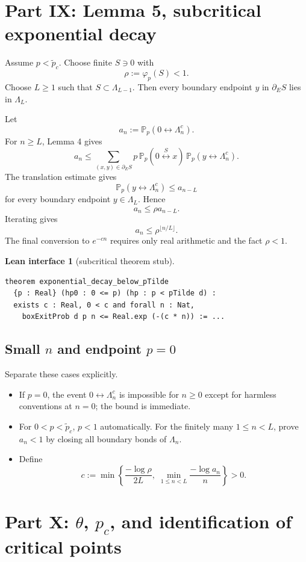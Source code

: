 \documentclass[11pt]{article}
\newcommand{\PP}{\mathbb P}
\newcommand{\conn}{\longleftrightarrow}
\newcommand{\pcrit}{p_c}
\newcommand{\ptilde}{\widetilde p_c}
\newcommand{\Lam}{\Lambda}
\newcommand{\dE}{\partial_E}
\theoremstyle{definition}
\newtheorem{interface}[definition]{Lean interface}
\theoremstyle{plain}
\begin{document}
\section{Part IX: Lemma 5, subcritical exponential decay}

Assume $p<\ptilde$.  Choose finite $S\ni0$ with
\[
  \rho:=\varphi_p(S)<1.
\]
Choose $L\ge1$ such that $S\subset\Lam_{L-1}$.  Then every boundary endpoint $y$ in $\dE S$ lies in $\Lam_L$.

Let
\[
  a_n:=\PP_p(0\conn\Lam_n^c).
\]
For $n\ge L$, Lemma 4 gives
\[
  a_n
  \le
  \sum_{(x,y)\in\dE S}
  p\,\PP_p(0\stackrel S\conn x)\,
  \PP_p(y\conn\Lam_n^c).
\]
The translation estimate gives
\[
  \PP_p(y\conn\Lam_n^c)
  \le a_{n-L}
\]
for every boundary endpoint $y\in\Lam_L$.  Hence
\[
  a_n\le \rho a_{n-L}.
\]
Iterating gives
\[
  a_n\le \rho^{\lfloor n/L\rfloor}.
\]
The final conversion to $e^{-cn}$ requires only real arithmetic and the fact $\rho<1$.

\begin{interface}[subcritical theorem stub]
\begin{lstlisting}
theorem exponential_decay_below_pTilde
  {p : Real} (hp0 : 0 <= p) (hp : p < pTilde d) :
  exists c : Real, 0 < c and forall n : Nat,
    boxExitProb d p n <= Real.exp (-(c * n)) := ...
\end{lstlisting}
\end{interface}

\subsection{Small $n$ and endpoint $p=0$}

Separate these cases explicitly.
\begin{itemize}[leftmargin=1.4em]
  \item If $p=0$, the event $0\conn\Lam_n^c$ is impossible for $n\ge0$ except for harmless conventions at $n=0$; the bound is immediate.
  \item For $0<p<\ptilde$, $p<1$ automatically.  For the finitely many $1\le n<L$, prove $a_n<1$ by closing all boundary bonds of $\Lam_n$.
  \item Define
  \[
    c:=\min\left\{\frac{-\log\rho}{2L},\;\min_{1\le n<L}\frac{-\log a_n}{n}\right\}>0.
  \]
\end{itemize}

\section{Part X: $\theta$, $\pcrit$, and identification of critical points}
\end{document}
